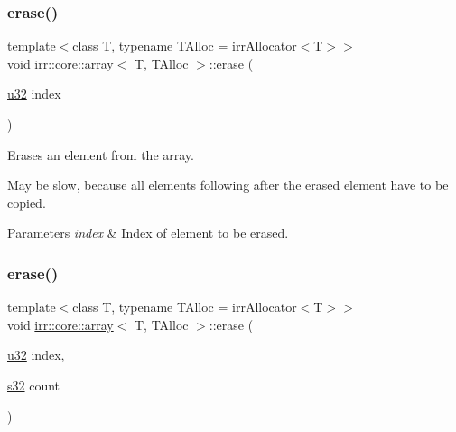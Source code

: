 \subsubsection{\texorpdfstring{erase()}{erase()}\hspace{0.1cm}{\footnotesize\ttfamily [1/2]}}
{\footnotesize\ttfamily template$<$class T, typename T\+Alloc = irr\+Allocator$<$\+T$>$$>$ \\
void \hyperlink{classirr_1_1core_1_1array}{irr\+::core\+::array}$<$ T, T\+Alloc $>$\+::erase (\begin{DoxyParamCaption}\item[{\hyperlink{namespaceirr_a0416a53257075833e7002efd0a18e804}{u32}}]{index }\end{DoxyParamCaption})\hspace{0.3cm}{\ttfamily [inline]}}



Erases an element from the array. 

May be slow, because all elements following after the erased element have to be copied. 
\begin{DoxyParams}{Parameters}
{\em index} & Index of element to be erased. \\
\hline
\end{DoxyParams}
\mbox{\label{classirr_1_1core_1_1array_ab9bb8cb0e6ebc4839fa2f7bc8e626800}} 
\subsubsection{\texorpdfstring{erase()}{erase()}\hspace{0.1cm}{\footnotesize\ttfamily [2/2]}}
{\footnotesize\ttfamily template$<$class T, typename T\+Alloc = irr\+Allocator$<$\+T$>$$>$ \\
void \hyperlink{classirr_1_1core_1_1array}{irr\+::core\+::array}$<$ T, T\+Alloc $>$\+::erase (\begin{DoxyParamCaption}\item[{\hyperlink{namespaceirr_a0416a53257075833e7002efd0a18e804}{u32}}]{index,  }\item[{\hyperlink{namespaceirr_ac66849b7a6ed16e30ebede579f9b47c6}{s32}}]{count }\end{DoxyParamCaption})\hspace{0.3cm}{\ttfamily [inline]}}



